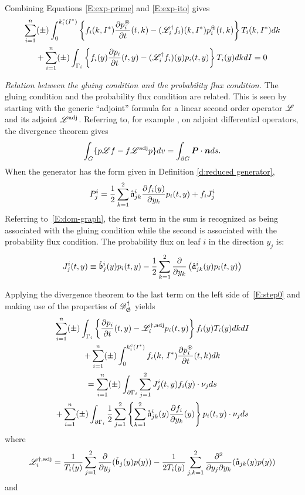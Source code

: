 Combining Equations \eqref{E:exp-prime} and \eqref{E:exp-ito} gives
\begin{multline}
\sum_{i=1}^n (\pm) \int_{0}^{k_{i}^{c}(I^*)} \left\{f_i(k,I^*) \frac{\partial p_i^\circledast}{\partial t}(t,k) - (\mathscr L^\dagger_i f_i)(k,I^*) p_i^\circledast(t,k) \right\} T_{i}(k,I^*) dk\\
+ \sum_{i=1}^n (\pm) \int_{\Gamma_i} \left\{f_i(y) \frac{\partial p_i}{\partial t}(t,y) - (\mathscr L^\dagger_i f_i)(y) p_{i}(t,y) \right\} T_i(y) dk dI = 0
\label{E:step0}
\end{multline}

\begin{remark}
\emph{Relation between the gluing condition and the probability flux condition.}
The gluing condition and the probability flux condition are related. This is seen by starting with the generic ``adjoint'' formula for a linear second order operator $\mathscr L$ and its adjoint $\mathscr L^\text{adj}$. Referring to, for example \citet[\S3.6]{zauderer98:_partial_differ_equat_of_applied_mathem}, on adjoint differential operators, the divergence theorem gives
\[
\int_G \{p \mathscr L f - f \mathscr L^{\text{adj}} p \}dv = \int_{\partial G} \boldsymbol{P}\cdot\boldsymbol{n} ds.
\]
When the generator has the form given in Definition \ref{d:reduced generator},
\[
P_j^i = \frac12 \sum_{k=1}^2 \mathring{\mathfrak a}^i_{jk} \frac{\partial f_{i}(y)}{\partial y_k} p_i(t,y) + f_i J_j^i
\]
Referring to~\eqref{E:dom-graph}, the first term in the sum is
recognized as being associated with the gluing condition while the
second is associated with the probability flux condition. The probability flux on leaf $i$ in the direction $y_j$ is:
\begin{equation}
\label{E:prob flux}
J_j^i(t,y) \equiv \mathring{\mathfrak{b}}_{j}^{i}(y) p_{i}(t,y) - \frac12 \sum_{k=1}^2 \frac{\partial}{\partial y_k} \left(
\mathring{\mathfrak a}_{jk}^i(y) p_i(t,y)\right)
\end{equation}
\end{remark}

Applying the divergence theorem to the last term on the left side of~\eqref{E:step0} and making use of the properties of $\mathscr{D}_\mathfrak G^\dag$ yields
\begin{multline}
\sum_{i=1}^n (\pm) \int_{\Gamma_i} \left\{ \frac{\partial p_{i}}{\partial t}(t,y) - \mathscr L^{\dagger,\text{adj}}_{i} p_{i} (t,y) \right\} f_{i}(y) T_{i}(y) dk dI\\
+ \sum_{i=1}^n (\pm) \int_{0}^{k_{i}^{c}(I^*)} f_{i}(k,\,I^*) \frac{\partial p_i^\circledast}{\partial t}(t,k) dk\\
= \sum_{i=1}^n(\pm) \int_{\partial\Gamma_i} \sum_{j=1}^2 J_j^i(t,y) f_i(y) \cdot \nu_j ds\\
+ \sum_{i=1}^n (\pm) \int_{\partial\Gamma_i} \frac12 \sum_{j=1}^2 \left\{\sum_{k=1}^2 \mathring{\mathfrak a}_{jk}^i(y) \frac{\partial f_{i}}{\partial y_k}(y)\right\} p_{i}(t,y) \cdot \nu_j ds
\label{E:step6}
\end{multline}
where
\[
\mathscr L^{\dagger,\text{adj}}_i = \frac{1}{T_i(y)} \sum_{j=1}^2 \frac{\partial}{\partial y_j}(\mathring{\mathfrak b}_j(y) p(y)) - \frac{1}{2 T_i(y)} \sum_{j,k=1}^2 \frac{\partial^2}{\partial y_j \partial y_k} (\mathring{\mathfrak a}_{jk}(y) p(y))
\]
and

